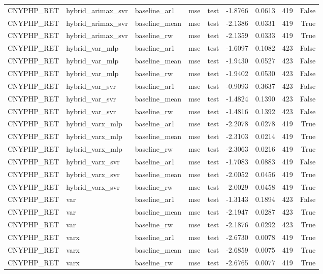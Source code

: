 \begin{tabular}{lllllrrrr}
CNYPHP_RET & hybrid_arimax_svr & baseline_ar1 & mse & test & -1.8766 & 0.0613 & 419 & False \\
CNYPHP_RET & hybrid_arimax_svr & baseline_mean & mse & test & -2.1386 & 0.0331 & 419 & True \\
CNYPHP_RET & hybrid_arimax_svr & baseline_rw & mse & test & -2.1359 & 0.0333 & 419 & True \\
CNYPHP_RET & hybrid_var_mlp & baseline_ar1 & mse & test & -1.6097 & 0.1082 & 423 & False \\
CNYPHP_RET & hybrid_var_mlp & baseline_mean & mse & test & -1.9430 & 0.0527 & 423 & False \\
CNYPHP_RET & hybrid_var_mlp & baseline_rw & mse & test & -1.9402 & 0.0530 & 423 & False \\
CNYPHP_RET & hybrid_var_svr & baseline_ar1 & mse & test & -0.9093 & 0.3637 & 423 & False \\
CNYPHP_RET & hybrid_var_svr & baseline_mean & mse & test & -1.4824 & 0.1390 & 423 & False \\
CNYPHP_RET & hybrid_var_svr & baseline_rw & mse & test & -1.4816 & 0.1392 & 423 & False \\
CNYPHP_RET & hybrid_varx_mlp & baseline_ar1 & mse & test & -2.2078 & 0.0278 & 419 & True \\
CNYPHP_RET & hybrid_varx_mlp & baseline_mean & mse & test & -2.3103 & 0.0214 & 419 & True \\
CNYPHP_RET & hybrid_varx_mlp & baseline_rw & mse & test & -2.3063 & 0.0216 & 419 & True \\
CNYPHP_RET & hybrid_varx_svr & baseline_ar1 & mse & test & -1.7083 & 0.0883 & 419 & False \\
CNYPHP_RET & hybrid_varx_svr & baseline_mean & mse & test & -2.0052 & 0.0456 & 419 & True \\
CNYPHP_RET & hybrid_varx_svr & baseline_rw & mse & test & -2.0029 & 0.0458 & 419 & True \\
CNYPHP_RET & var & baseline_ar1 & mse & test & -1.3143 & 0.1894 & 423 & False \\
CNYPHP_RET & var & baseline_mean & mse & test & -2.1947 & 0.0287 & 423 & True \\
CNYPHP_RET & var & baseline_rw & mse & test & -2.1876 & 0.0292 & 423 & True \\
CNYPHP_RET & varx & baseline_ar1 & mse & test & -2.6730 & 0.0078 & 419 & True \\
CNYPHP_RET & varx & baseline_mean & mse & test & -2.6859 & 0.0075 & 419 & True \\
CNYPHP_RET & varx & baseline_rw & mse & test & -2.6765 & 0.0077 & 419 & True \\

\end{tabular}
